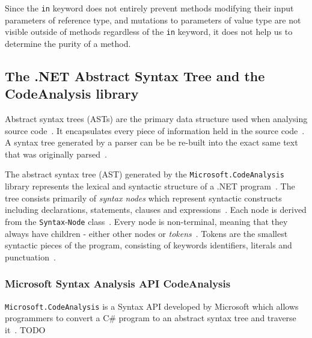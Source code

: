 \documentclass[a4paper,12pt]{article}
\begin{document}
Since the \texttt{in} keyword does not entirely prevent methods modifying their input parameters of reference type, and mutations to parameters of value type are not visible outside of methods regardless of the \texttt{in} keyword, it does not help us to determine the purity of a method.

\subsection{The .NET Abstract Syntax Tree and the CodeAnalysis library} \label{The .NET Abstract Syntax Tree and the CodeAnalysis library}

Abstract syntax trees (ASTs) are the primary data structure used when analysing source code~\cite{microsoft-work-with-syntax}. It encapsulates every piece of information held in the source code~\cite{microsoft-work-with-syntax}. A syntax tree generated by a parser can be be re-built into the exact same text that was originally parsed~\cite{microsoft-work-with-syntax}.

The abstract syntax tree (AST) generated by the \texttt{Microsoft.CodeAnalysis} library represents the lexical and syntactic structure of a .NET program~\cite{microsoft-work-with-syntax}. The tree consists primarily of \textit{syntax nodes} which represent syntactic constructs including declarations, statements, clauses and expressions~\cite{microsoft-work-with-syntax}. Each node is derived from the \texttt{Syntax}-\texttt{Node} class~\cite{microsoft-work-with-syntax}. Every node is non-terminal, meaning that they always have children - either other nodes or \textit{tokens}~\cite{microsoft-work-with-syntax}. Tokens are the smallest syntactic pieces of the program, consisting of keywords identifiers, literals and punctuation~\cite{microsoft-work-with-syntax}.


\subsubsection{Microsoft Syntax Analysis API CodeAnalysis} \label{ssub:Microsoft Syntax Analysis API}
\texttt{Microsoft.CodeAnalysis} is a Syntax API developed by Microsoft which allows programmers to convert a C\# program to an abstract syntax tree and traverse it~\cite{microsoft-syntax-API}. TODO
\end{document}
